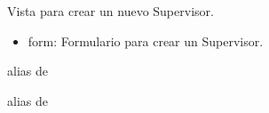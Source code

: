 \documentclass[letterpaper,10pt,spanish]{sphinxmanual}
\begin{document}
\begin{fulllineitems}

\pysigstartsignatures
{}
\pysigstopsignatures
\sphinxAtStartPar
Vista para crear un nuevo Supervisor.
\begin{description}
\begin{itemize}
\item {} 
\sphinxAtStartPar
form: Formulario para crear un Supervisor.

\end{itemize}

\end{description}


\begin{fulllineitems}

\pysigstartsignatures
{}
\pysigstopsignatures
\sphinxAtStartPar
alias de 

\end{fulllineitems}



\begin{fulllineitems}

\pysigstartsignatures
{}
\pysigstopsignatures
\sphinxAtStartPar
alias de 

\end{fulllineitems}



\begin{fulllineitems}

\pysigstartsignatures
{}
\pysigstopsignatures
\end{fulllineitems}



\begin{fulllineitems}

\pysigstartsignatures
{}
\pysigstopsignatures
\end{fulllineitems}


\end{fulllineitems}
\end{document}
